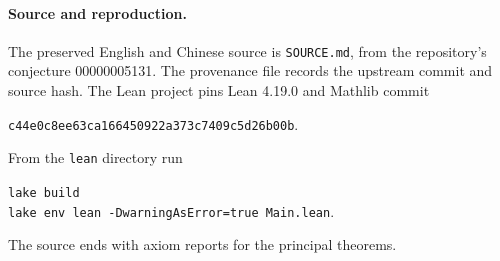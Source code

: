 \documentclass[11pt]{article}
\begin{document}
\paragraph{Source and reproduction.}
The preserved English and Chinese source is \texttt{SOURCE.md}, from
the repository's conjecture 00000005131. The provenance file records
the upstream commit and source hash. The Lean project pins
Lean 4.19.0 and Mathlib commit
\begin{center}\texttt{c44e0c8ee63ca166450922a373c7409c5d26b00b}.\end{center}
From the \texttt{lean} directory run
\begin{center}\texttt{lake build}\\
\texttt{lake env lean -DwarningAsError=true Main.lean}.\end{center}
The source ends with axiom reports for the principal theorems.
\end{document}

